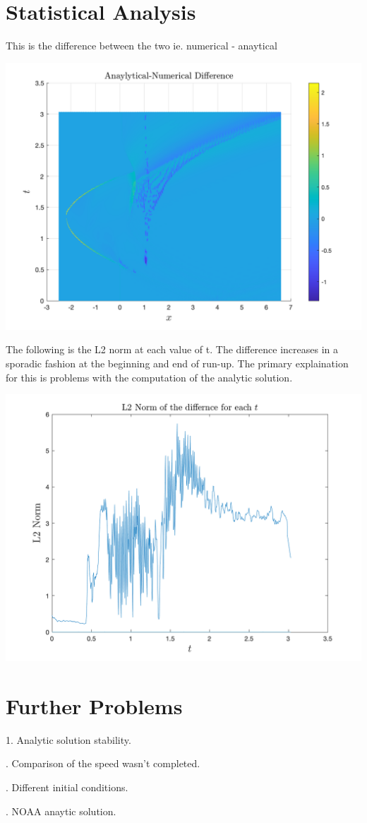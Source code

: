 \documentclass{article}
\begin{document}
\section{Statistical Analysis}

This is the difference between the two ie. numerical - anaytical

\includegraphics[width=\linewidth]{diff.png}

\noindent The following is the L2 norm at each value of t. The difference increases in a sporadic fashion at the beginning and end of run-up. The primary explaination for this is problems with the computation of the analytic solution.


\includegraphics[width=\linewidth]{l2.png}

\section{Further Problems}

1. Analytic solution stability.

. Comparison of the speed wasn't completed.

. Different initial conditions.

. NOAA anaytic solution.
\end{document}
